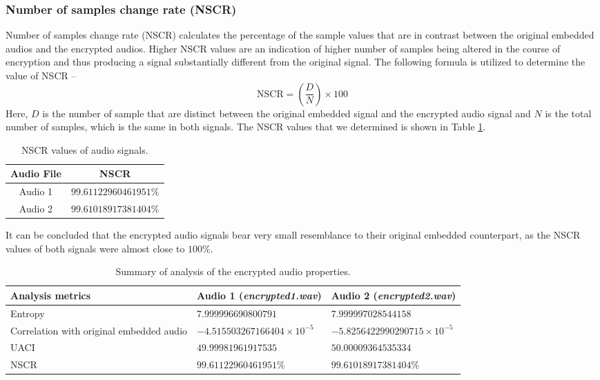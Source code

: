 \documentclass{article}
\begin{document}
\subsubsection{Number of samples change rate (NSCR)}
Number of samples change rate (NSCR) calculates the percentage of the sample values that are in contrast between the original embedded audios and the encrypted audios. Higher NSCR values are an indication of higher number of samples being altered in the course of encryption and thus producing a signal substantially different from the original signal. The following formula is utilized to determine the value of NSCR --
\[\text{NSCR}=\left(\frac{D}{N}\right)\times100\]
Here, $D$ is the number of sample that are distinct between the original embedded signal and the encrypted audio signal and $N$ is the total number of samples, which is the same in both signals. The NSCR values that we determined is shown in Table \ref{table:nscr}.
\begin{table}[!h]
    \begin{center}
        \caption{NSCR values of audio signals.}
        \begin{tabular}{cc}
            \hline
            Audio File & NSCR                  \\ \hline
            Audio 1    & $99.61122960461951\%$ \\ \hdashline
            Audio 2    & $99.61018917381404\%$ \\ \hline
        \end{tabular}
        \label{table:nscr}
    \end{center}
\end{table}

It can be concluded that the encrypted audio signals bear very small resemblance to their original embedded counterpart, as the NSCR values of both signals were almost close to $100\%$.

\begin{table}[!h]
    \begin{center}
        \caption{Summary of analysis of the encrypted audio properties.}
        \begin{tabularx}{\textwidth}{>{\centering\arraybackslash}X>{\centering\arraybackslash}X>{\centering\arraybackslash}X}
            \hline
            Analysis metrics                         & Audio 1 (\textit{encrypted1.wav}) & Audio 2 (\textit{encrypted2.wav})  \\ \hline
            Entropy                                  & $7.999996690800791$               & $7.999997028544158$                \\
            Correlation with original embedded audio & $-4.515503267166404\times10^{-5}$ & $-5.8256422990290715\times10^{-5}$ \\
            UACI                                     & $49.99981961917535$               & $50.00009364535334$                \\
            NSCR                                     & $99.61122960461951\%$             & $99.61018917381404\%$              \\ \hline
        \end{tabularx}
        \label{table:analysis}
    \end{center}
\end{table}
\end{document}
